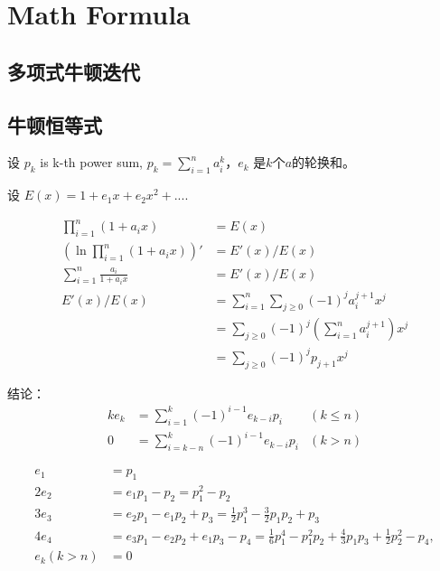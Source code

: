\section{Math Formula}

\subsection{多项式牛顿迭代}

\subsection{牛顿恒等式}
设 $p_k$ is k-th power sum, $p_k=\sum_{i=1}^n a_i^k$，$e_k$ 是$k$个$a$的轮换和。

设 $E(x)=1+e_1x+e_2x^2+...$.

\begin{equation*}
    \begin{aligned}
        \prod_{i=1}^n (1+a_ix)&=E(x)\\
        (\ln \prod_{i=1}^n (1+a_ix))'&=E'(x)/E(x)\\
        \sum_{i=1}^n \frac{a_i}{1+a_ix}&=E'(x)/E(x)\\
        E'(x)/E(x)&=\sum_{i=1}^n\sum_{j\ge 0}(-1)^{j}a_i^{j+1}x^j\\
        &=\sum_{j\ge 0}(-1)^j\left(\sum_{i=1}^n a_i^{j+1}\right)x^j\\
        &=\sum_{j\ge 0}(-1)^j p_{j+1} x^j
    \end{aligned}
\end{equation*}

结论：
\begin{equation*}
    \begin{aligned}
        ke_k&=\sum_{i=1}^{k}(-1)^{i-1}e_{k-i}p_i &(k\le n)\\
        0&=\sum_{i=k-n}^k(-1)^{i-1}e_{k-i}p_i&(k>n)
    \end{aligned}
\end{equation*}

\begin{equation*}
    \begin{aligned}
        e_1 &=p_1 \\
        2 e_2 &=e_1 p_1-p_2=p_1^2-p_2 \\
        3 e_3 &=e_2 p_1-e_1 p_2+p_3=\frac{1}{2} p_1^3-\frac{3}{2} p_1 p_2+p_3 \\
        4 e_4 &=e_3 p_1-e_2 p_2+e_1 p_3-p_4=\frac{1}{6} p_1^4-p_1^2 p_2+\frac{4}{3} p_1 p_3+\frac{1}{2} p_2^2-p_4,\\
        e_k(k>n)&=0
    \end{aligned}
\end{equation*}



